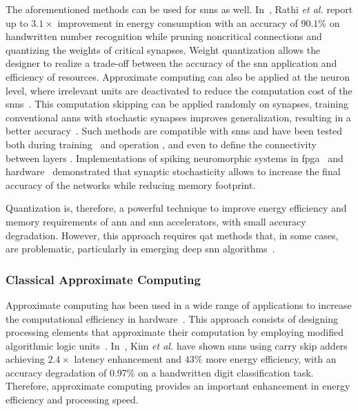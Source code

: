The aforementioned methods can be used for \glspl{snn} as well. In~\cite{rathi2018stdp}, Rathi \textit{et al.} report up to $3.1\times$ improvement in energy consumption with an accuracy of $90.1\%$ on handwritten number recognition while pruning noncritical connections and quantizing the weights of critical synapses. Weight quantization allows the designer to realize a trade-off between the accuracy of the \gls{snn} application and efficiency of resources. Approximate computing can also be applied at the neuron level, where irrelevant units are deactivated to reduce the computation cost of the \glspl{snn}~\cite{sen2017approximate}. This computation skipping can be applied randomly on synapses, training conventional \glspl{ann} with stochastic synapses improves generalization, resulting in a better accuracy~\cite{srivastava2014dropout, wan2013regularization}. Such methods are compatible with \glspl{snn} and have been tested both during training~\cite{neftci2016stochastic, srinivasan2016magnetic} and operation \cite{buesing2011neural}, and even to define the connectivity between layers \cite{bellec2017deep, chen20184096}. Implementations of spiking neuromorphic systems in \gls{fpga}~\cite{sheik2016synaptic} and hardware~\cite{jerry2017ultra} demonstrated that synaptic stochasticity allows to increase the final accuracy of the networks while reducing memory footprint.

Quantization is, therefore, a powerful technique to improve energy efficiency and memory requirements of \gls{ann} and \gls{snn} accelerators, with small accuracy degradation. However, this approach requires \gls{qat} methods that, in some cases, are problematic, particularly in emerging deep \gls{snn} algorithms~\cite{zhang2018survey}.

\subsubsection{Classical Approximate Computing}
Approximate computing has been used in a wide range of applications to increase the computational efficiency in hardware~\cite{han2013approximate}. This approach consists of designing processing elements that approximate their computation by employing modified algorithmic logic units~\cite{han2013approximate}. In~\cite{kim2013energy}, Kim \textit{et al.} have shown \glspl{snn} using carry skip adders achieving $2.4\times$ latency enhancement and $43\%$ more energy efficiency, with an accuracy degradation of 0.97\% on a handwritten digit classification task. Therefore, approximate computing provides an important enhancement in energy efficiency and processing speed.

